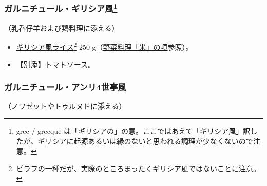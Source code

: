 \begin{recette}
\atoaki{}

\hypertarget{garniture-a-la-grecque}{%
\subsubsection[ガルニチュール・ギリシア風]{\texorpdfstring{ガルニチュール・ギリシア風\footnote{grec
  / grecque
  は「ギリシアの」の意。ここではあえて「ギリシア風」訳したが、ギリシアに起源あるいは縁のないと思われる調理が少なくないので注意。}}{ガルニチュール・ギリシア風}}\label{garniture-a-la-grecque}}



（乳呑仔羊および鶏料理に添える）

\begin{itemize}
\item
  \protect\hyperlink{riz-a-la-grecque}{ギリシア風ライス}\footnote{ピラフの一種だが、実際のところまったくギリシア風ではないことに注意。}
  250 g（\protect\hyperlink{riz}{野菜料理「米」の項}参照）。
\item
  【別添】\protect\hyperlink{sauce-tomate}{トマトソース}。
\end{itemize}

\atoaki{}

\hypertarget{garniture-henri-iv}{%
\subsubsection{ガルニチュール・アンリ4世亭風}\label{garniture-henri-iv}}



（ノワゼットやトゥルヌドに添える）


\end{recette}
